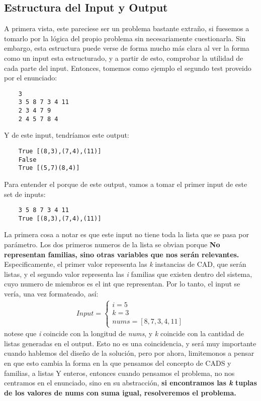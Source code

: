 \documentclass[a4paper]{article}
\begin{document}
\subsection{Estructura del Input y Output}
A primera vista, este pareciese ser un problema bastante extraño, si fuesemos a tomarlo por la lógica
del propio problema sin necesariamente cuestionarla. Sin embargo, esta estructura puede verse de forma mucho
más clara al ver la forma como un input esta estructurado, y a partir de esto, comprobar la
utilidad de cada parte del input. Entonces, tomemos como ejemplo el segundo test proveido por el
enunciado:
\begin{verbatim}
    3 
    3 5 8 7 3 4 11
    2 3 4 7 9 
    2 4 5 7 8 4
\end{verbatim}
Y de este input, tendríamos este output:
\begin{verbatim}
    True [(8,3),(7,4),(11)]
    False
    True [(5,7)(8,4)]
\end{verbatim}
Para entender el porque de este output, vamos a tomar el primer input de este
set de inputs:
\begin{verbatim}
    3 5 8 7 3 4 11
    True [(8,3),(7,4),(11)]
\end{verbatim}
La primera cosa a notar es que este input no tiene toda la lista que se pasa por
parámetro. Los dos primeros numeros de la lista se obvian porque \textbf{No representan
familias, sino otras variables que nos serán relevantes.} Especificamente, el primer valor
representa las \textit{k} instancias de CAD, que serán listas, y el segundo valor representa
las \textit{i} familias que existen dentro del sistema, cuyo numero de miembros es
el int que representan. Por lo tanto, el input se vería, una vez formateado, así:
\begin{align*}
    Input = \begin{cases}
        i = 5 \\
        k = 3 \\
        nums = [8, 7, 3, 4, 11]
    \end{cases}
\end{align*}
notese que \textit{i} coincide con la longitud de \textit{nums}, y \textit{k} coincide
con la cantidad de listas generadas en el output. Esto no es una coincidencia, y será muy
importante cuando hablemos del diseño de la solución, pero por ahora, limitemonos a pensar
en que esto cambia la forma en la que pensamos del concepto de CADS y familias, a listas Y
enteros, entonces cuando pensamos el problema, no nos centramos en el enunciado, sino en su 
abstracción, \textbf{si encontramos las \textit{k} tuplas de los valores de nums con suma igual,
resolveremos el problema.}
\end{document}
